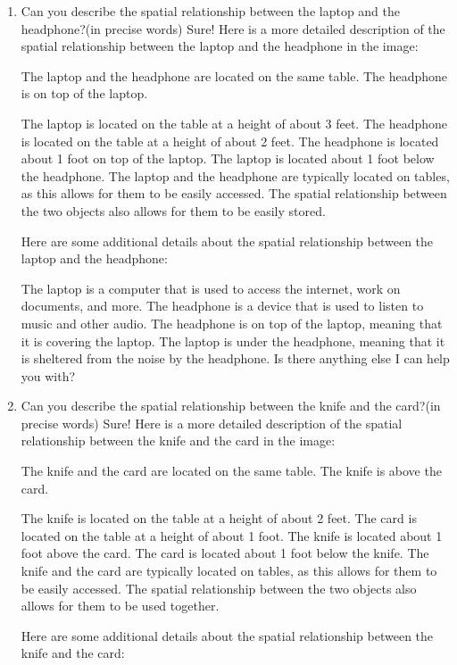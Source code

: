 \begin{enumerate}
    \item Can you describe the spatial relationship between the laptop and the headphone?(in precise words)
    \subitem 
    Sure! Here is a more detailed description of the spatial relationship between the laptop and the headphone in the image:
    
    The laptop and the headphone are located on the same table. The headphone is on top of the laptop.
    
    The laptop is located on the table at a height of about 3 feet.
    The headphone is located on the table at a height of about 2 feet.
    The headphone is located about 1 foot on top of the laptop.
    The laptop is located about 1 foot below the headphone.
    The laptop and the headphone are typically located on tables, as this allows for them to be easily accessed. The spatial relationship between the two objects also allows for them to be easily stored.
    
    Here are some additional details about the spatial relationship between the laptop and the headphone:
    
    The laptop is a computer that is used to access the internet, work on documents, and more.
    The headphone is a device that is used to listen to music and other audio.
    The headphone is on top of the laptop, meaning that it is covering the laptop.
    The laptop is under the headphone, meaning that it is sheltered from the noise by the headphone.
    Is there anything else I can help you with?
    \item Can you describe the spatial relationship between the knife and the card?(in precise words)
    \subitem 
    Sure! Here is a more detailed description of the spatial relationship between the knife and the card in the image:
    
    The knife and the card are located on the same table. The knife is above the card.
    
    The knife is located on the table at a height of about 2 feet.
    The card is located on the table at a height of about 1 foot.
    The knife is located about 1 foot above the card.
    The card is located about 1 foot below the knife.
    The knife and the card are typically located on tables, as this allows for them to be easily accessed. The spatial relationship between the two objects also allows for them to be used together.
    
    Here are some additional details about the spatial relationship between the knife and the card:
    

\end{enumerate}
